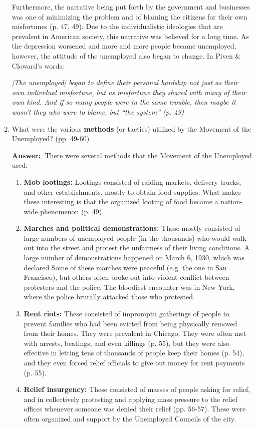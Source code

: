 \documentclass{article}
\newcommand{\answer}{\textbf{Answer:}$\;$}
\begin{document}
\begin{enumerate}[label=\arabic*)]
    Furthermore, the narrative being put forth by the government and businesses was one of minimizing the problem and of blaming the citizens for their own misfortunes (p. 47, 49).
    Due to the individualistic ideologies that are prevalent in American society, this narrative was believed for a long time.
    As the depression worsened and more and more people became unemployed, however, the attitude of the unemployed also began to change.
    In Piven \& Cloward's words:
    \begin{center}
        \textit{[The unemployed] began to define their personal hardship not just as their own individual misfortune, but as misfortune they shared with many of their own kind.
        And if so many people were in the same trouble, then maybe it wasn't they who were to blame, but ``the system'' (p. 49)}
    \end{center}

    \item What were the various \textbf{methods} (or tactics) utilized by the Movement of the Unemployed? (pp. 49-60)

    \answer
    There were several methods that the Movement of the Unemployed used:
    \begin{enumerate}
        \item 
        \textbf{Mob lootings:}
        Lootings consisted of raiding markets, delivery trucks, and other establishments, mostly to obtain food supplies.
        What makes these interesting is that the organized looting of food became a nation-wide phenomenon (p. 49).
        \item
        \textbf{Marches and political demonstrations:}
        These mostly consisted of large numbers of unemployed people (in the thousands) who would walk out into the street and protest the unfairness of their living conditions.
        A large number of demonstrations happened on March 6, 1930, which was declared 
        Some of these marches were peaceful (e.g. the one in San Francisco), but others often broke out into violent conflict between protesters and the police.
        The bloodiest encounter was in New York, where the police brutally attacked those who protested.
        \item
        \textbf{Rent riots:}
        These consisted of impromptu gatherings of people to prevent families who had been evicted from being physically removed from their homes.
        They were prevalent in Chicago.
        They were often met with arrests, beatings, and even killings (p. 55), but they were also effective in letting tens of thousands of people keep their homes (p. 54), and they even forced relief officials to give out money for rent payments (p. 55).
        \item \textbf{Relief insurgency:}
        These consisted of masses of people asking for relief, and in collectively protesting and applying mass pressure to the relief offices whenever someone was denied their relief (pp. 56-57).
        These were often organized and support by the Unemployed Councils of the city.
        

\end{enumerate}
\end{enumerate}
\end{document}
